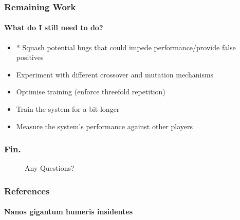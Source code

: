 \documentclass[aspectratio=169]{beamer}
\begin{document}
\begin{frame}
	\frametitle{Remaining Work}
	\framesubtitle{What do I still need to do?}
	\begin{itemize}
		\item * Squash potential bugs that could impede performance/provide false positives
		\item Experiment with different crossover and mutation mechanisms
		\item Optimise training (enforce threefold repetition)
		\item Train the system for a bit longer
		\item Measure the system's performance against other players
	\end{itemize}
\end{frame}

\begin{frame}
	\frametitle{Fin.}
	
	\begin{figure}
		\LARGE
	Any Questions?
	\end{figure}
\end{frame}

\begin{frame}
	\frametitle{References}
	\framesubtitle{Nanos gigantum humeris insidentes}
	
	

\end{frame}
\end{document}
